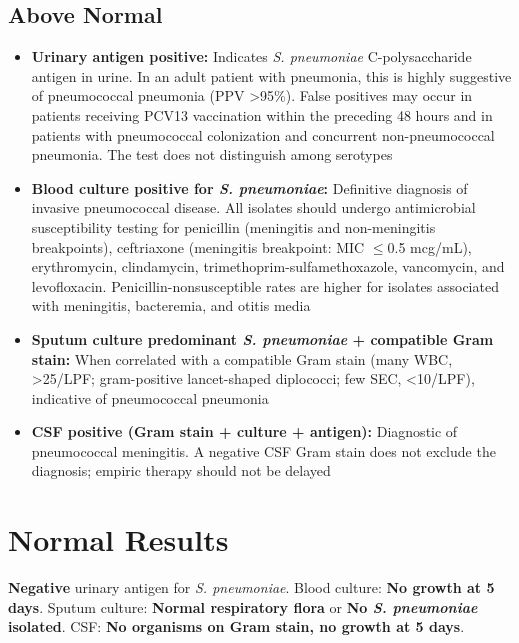 \subsection*{Above Normal}
\begin{itemize}
  \item \textbf{Urinary antigen positive:} Indicates \textit{S. pneumoniae} C-polysaccharide antigen in urine. In an adult patient with pneumonia, this is highly suggestive of pneumococcal pneumonia (PPV >95\%). False positives may occur in patients receiving PCV13 vaccination within the preceding 48 hours and in patients with pneumococcal colonization and concurrent non-pneumococcal pneumonia. The test does not distinguish among serotypes
  \item \textbf{Blood culture positive for \textit{S. pneumoniae}:} Definitive diagnosis of invasive pneumococcal disease. All isolates should undergo antimicrobial susceptibility testing for penicillin (meningitis and non-meningitis breakpoints), ceftriaxone (meningitis breakpoint: MIC $\leq$0.5 mcg/mL), erythromycin, clindamycin, trimethoprim-sulfamethoxazole, vancomycin, and levofloxacin. Penicillin-nonsusceptible rates are higher for isolates associated with meningitis, bacteremia, and otitis media
  \item \textbf{Sputum culture predominant \textit{S. pneumoniae} + compatible Gram stain:} When correlated with a compatible Gram stain (many WBC, >25/LPF; gram-positive lancet-shaped diplococci; few SEC, <10/LPF), indicative of pneumococcal pneumonia
  \item \textbf{CSF positive (Gram stain + culture + antigen):} Diagnostic of pneumococcal meningitis. A negative CSF Gram stain does not exclude the diagnosis; empiric therapy should not be delayed
\end{itemize}

\section*{Normal Results}
\textbf{Negative} urinary antigen for \textit{S. pneumoniae}. Blood culture: \textbf{No growth at 5 days}. Sputum culture: \textbf{Normal respiratory flora} or \textbf{No \textit{S. pneumoniae} isolated}. CSF: \textbf{No organisms on Gram stain, no growth at 5 days}.

